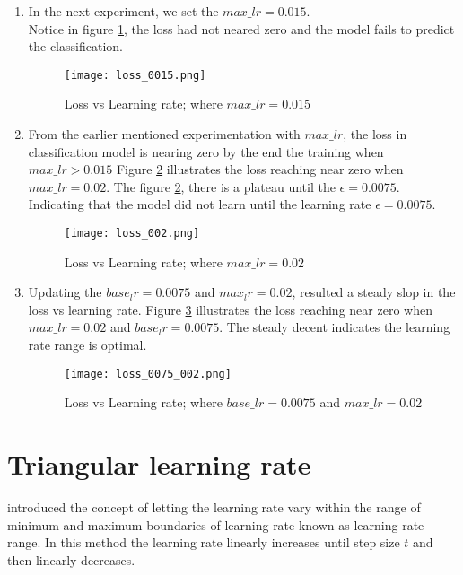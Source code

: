 \begin{enumerate}
    \item In the next experiment, we set the $max\_lr = 0.015$. \\
    Notice in figure \ref{fig:Loss value at 0.015}, the loss had not neared zero and the model fails to predict the classification. 
    \begin{figure}
        \centering    
        \texttt{[image: loss\_0015.png]}
        \caption{Loss vs Learning rate; where $max\_lr = 0.015$}
        \label{fig:Loss value at 0.015}
    \end{figure}

    \item From the earlier mentioned experimentation with $max\_lr$,  the loss in classification model is nearing zero by the end the training  when  $max\_lr > 0.015$ 
    Figure \ref{fig:Loss value at 0.02} illustrates the loss reaching near zero when $max\_lr = 0.02$. The figure  \ref{fig:Loss value at 0.02}, there is a plateau until the $ \epsilon = 0.0075$. Indicating that the model did not learn until the learning rate $ \epsilon = 0.0075$.
    \begin{figure}
        \centering    
        \texttt{[image: loss\_002.png]}
        \caption{Loss vs Learning rate; where $max\_lr = 0.02$}
        \label{fig:Loss value at 0.02}
    \end{figure}

    \item Updating the $base_lr=0.0075$ and $max_lr=0.02$, resulted a steady slop in the loss vs learning rate.  
    Figure \ref{fig:Loss value at 0.0075} illustrates the loss reaching near zero when $max\_lr = 0.02$ and $base_lr=0.0075$. The steady decent indicates the learning rate range is optimal.
    \begin{figure}
        \centering    
        \texttt{[image: loss\_0075\_002.png]}
        \caption{Loss vs Learning rate; where $base\_lr = 0.0075$ and $max\_lr = 0.02$ }
        \label{fig:Loss value at 0.0075}
    \end{figure}
    

\end{enumerate}

\section{Triangular learning rate}

\parencite{Smith.03062015} introduced the concept of letting the learning rate vary within the range of minimum and maximum boundaries of learning rate known as learning rate range. In this method the learning rate linearly increases until step size $ t $ and then linearly decreases. 


